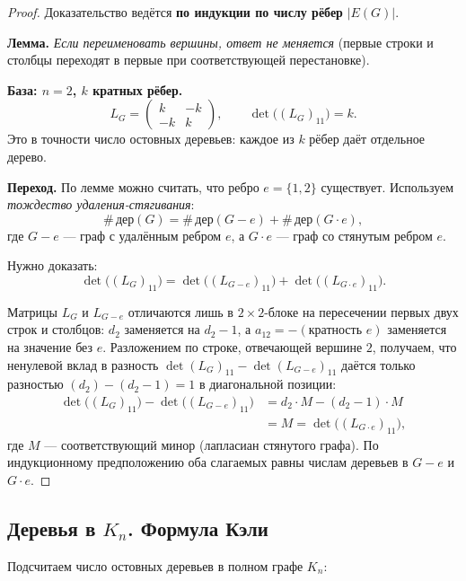 \begin{proof}
	Доказательство ведётся \textbf{по индукции по числу рёбер} $|E(G)|$.
	
	\medskip
	\textbf{Лемма.} \emph{Если переименовать вершины, ответ не меняется} (первые строки и столбцы переходят в первые при соответствующей перестановке).
	
	\medskip
	\textbf{База: $n = 2$, $k$ кратных рёбер.}
	\[
	L_G =
	\begin{pmatrix} k & -k \\ -k & k \end{pmatrix},
	\qquad
	\det\!\bigl((L_G)_{11}\bigr) = k.
	\]
	Это в точности число остовных деревьев: каждое из $k$ рёбер даёт отдельное дерево.\checkmark
	
	\medskip
	\textbf{Переход.} По лемме можно считать, что ребро $e = \{1,2\}$ существует. Используем
	\emph{тождество удаления-стягивания}:
	\[
	\#\,\text{дер}(G) = \#\,\text{дер}(G{-}e) + \#\,\text{дер}(G{\cdot}e),
	\]
	где $G{-}e$ — граф с удалённым ребром $e$, а $G{\cdot}e$ — граф со стянутым ребром $e$.
	
	Нужно доказать:
	\[
	\det\!\bigl((L_G)_{11}\bigr)
	= \det\!\bigl((L_{G-e})_{11}\bigr) + \det\!\bigl((L_{G\cdot e})_{11}\bigr).
	\]
	
	Матрицы $L_G$ и $L_{G-e}$ отличаются лишь в $2\times2$-блоке на пересечении первых двух строк и столбцов: $d_2$ заменяется на $d_2{-}1$, а $a_{12}=-(\text{кратность } e)$ заменяется на значение без $e$. Разложением по строке, отвечающей вершине $2$, получаем, что ненулевой вклад в разность $\det(L_G)_{11} - \det(L_{G-e})_{11}$ даётся только разностью $(d_2) - (d_2{-}1) = 1$ в диагональной позиции:
	\begin{align*}
		\det\!\bigl((L_G)_{11}\bigr) - \det\!\bigl((L_{G-e})_{11}\bigr)
		&= d_2 \cdot M - (d_2{-}1)\cdot M \\
		&= M = \det\!\bigl((L_{G\cdot e})_{11}\bigr),
	\end{align*}
	где $M$ — соответствующий минор (лапласиан стянутого графа). По индукционному предположению оба слагаемых равны числам деревьев в $G{-}e$ и $G{\cdot}e$.
\end{proof}

\subsection{Деревья в \texorpdfstring{$K_n$}{Kn}. Формула Кэли}

Подсчитаем число остовных деревьев в полном графе $K_n$:

